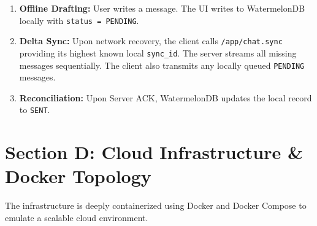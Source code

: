 \documentclass[12pt, a4paper]{article}
\begin{document}
\vspace{0.5cm}
\begin{center}
\end{center}
\vspace{0.5cm}

\begin{enumerate}
    \item \textbf{Offline Drafting:} User writes a message. The UI writes to WatermelonDB locally with \texttt{status = PENDING}.
    \item \textbf{Delta Sync:} Upon network recovery, the client calls \texttt{/app/chat.sync} providing its highest known local \texttt{sync\_id}. The server streams all missing messages sequentially. The client also transmits any locally queued \texttt{PENDING} messages.
    \item \textbf{Reconciliation:} Upon Server ACK, WatermelonDB updates the local record to \texttt{SENT}.
\end{enumerate}


\section{Section D: Cloud Infrastructure \& Docker Topology}
\label{sec:docker}

The infrastructure is deeply containerized using Docker and Docker Compose to emulate a scalable cloud environment.
\end{document}
